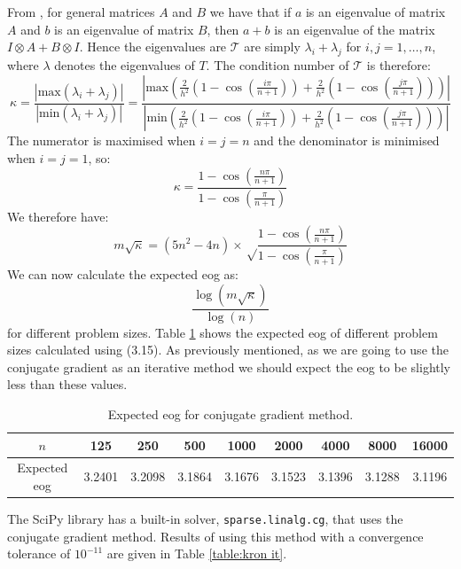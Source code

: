 \documentclass[11pt]{article}
\numberwithin{equation}{section}
\begin{document}
From \cite{Schacke}, for general matrices $A$ and $B$ we have that if $a$ is an eigenvalue of matrix $A$ and $b$ is an eigenvalue of matrix $B$, then $a + b$ is an eigenvalue of the matrix $I \otimes A + B \otimes I$. Hence the eigenvalues are $\mathcal{T}$ are simply $\lambda_i + \lambda_j$ for $i,j=1,\dots,n$, where $\lambda$ denotes the eigenvalues of $T$. The condition number of $\mathcal{T}$ is therefore:
\begin{equation}
\kappa = \frac{|\text{max} (\lambda_i + \lambda_j)|}{|\text{min}(\lambda_i + \lambda_j)|} 
= \frac{\left|\text{max} \left(\frac{2}{h^2} \left(1-\cos \left( \frac{i\pi}{n+1} \right) \right) 
+ \frac{2}{h^2} \left( 1-\cos \left( \frac{j\pi}{n+1} \right) \right) \right) \right|}
{\left|\text{min} \left( \frac{2}{h^2} \left( 1-\cos \left( \frac{i\pi}{n+1} \right) \right) 
+ \frac{2}{h^2} \left( 1-\cos \left( \frac{j\pi}{n+1} \right) \right) \right) \right|}
\end{equation}
The numerator is maximised when $i=j=n$ and the denominator is minimised when $i=j=1$, so:
\begin{equation}
\kappa = \frac{1-\cos \left(\frac{n \pi}{n+1} \right)}{1-\cos \left(\frac{\pi}{n+1} \right)}
\end{equation}
We therefore have:
\begin{equation}
m\sqrt{\kappa} = (5n^2-4n) \times \sqrt \frac{1-\cos \left(\frac{n \pi}{n+1} \right)}{1-\cos \left(\frac{\pi}{n+1} \right)}
\end{equation}
We can now calculate the expected eog as:
\begin{equation}
\frac{\log(m \sqrt \kappa)}{\log(n)}
\end{equation}
for different problem sizes. Table \ref{table:cg eog} shows the expected eog of different problem sizes calculated using (3.15). As previously mentioned, as we are going to use the conjugate gradient as an iterative method we should expect the eog to be slightly less than these values. 
\begin{table}[H]
\centering
\begin{tabular}{|c|c|c|c|c|c|c|c|c|}
\hline
$n$ & 125 & 250 & 500 & 1000 & 2000 & 4000 & 8000 & 16000 \\
\hline
Expected eog & 3.2401 & 3.2098 & 3.1864 & 3.1676 & 3.1523 & 3.1396 & 3.1288 & 3.1196 \\
\hline
\end{tabular}
\caption{Expected eog for conjugate gradient method.}
\label{table:cg eog}
\end{table}
The SciPy library has a built-in solver, \texttt{sparse.linalg.cg}, that uses the conjugate gradient method. Results of using this method with a convergence tolerance of $10^{-11}$ are given in Table \ref{table:kron it}. 
\end{document}
